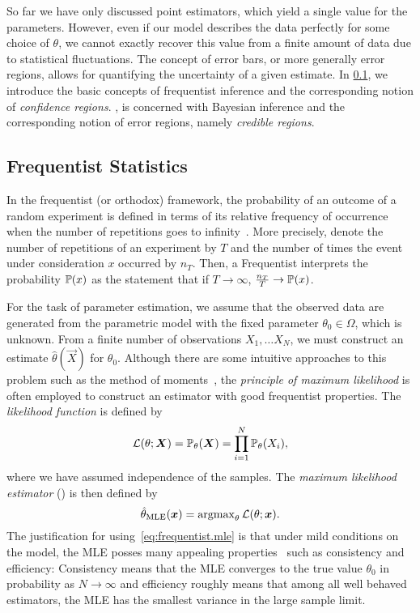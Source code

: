 So far we have only discussed point estimators, which yield a single value for the parameters.
However, even if our model describes the data perfectly for some choice of $\theta$, we cannot exactly recover this value from a finite amount of data due to statistical fluctuations.
The concept of error bars, or more generally error regions, allows for quantifying the uncertainty of a given estimate.
In \cref{sub:intro.frequentist}, we introduce the basic concepts of frequentist inference and the corresponding notion of \emph{confidence regions}.
, is concerned with Bayesian inference and the corresponding notion of error regions, namely \emph{credible regions}.



\subsection{Frequentist Statistics}
\label{sub:intro.frequentist}

In the frequentist (or orthodox) framework, the probability of an outcome of a random experiment is defined in terms of its relative frequency of occurrence when the number of repetitions goes to infinity~\cite{Keynes_2007_Treatise,Kiefer_2012_Introduction}.
More precisely, denote the number of repetitions of an experiment by $T$ and the number of times the event under consideration $x$ occurred by $n_T$.
Then, a Frequentist interprets the probability $\mathbb{P}(x)$ as the statement that if $T \to \infty$, $\frac{n_T}{T} \to \mathbb{P}(x)$.

For the task of parameter estimation, we assume that the observed data are generated from the parametric model with the fixed  parameter $\theta_0 \in \Omega$, which is unknown.
From a finite number of observations $X_1, \ldots X_N$, we must construct an estimate $\hat\theta(\vec X)$ for $\theta_0$.
Although there are some intuitive approaches to this problem such as the method of moments~\cite[Sec.\ 9.2]{Wasserman_2013_All}, the \emph{principle of maximum likelihood} is often employed to construct an estimator with good frequentist properties.
The \emph{likelihood function} is defined by
\[
  \mathcal{L}(\theta; \boldsymbol{X}) = \mathbb{P}_\theta(\boldsymbol{X}) = \prod_{i=1}^N \mathbb{P}_\theta(X_i),
  \label{eq:frequentist.likelihood_function}
\]
where we have assumed independence of the samples.
The \emph{maximum likelihood estimator} () is then defined by
\[
  \hat{\theta}_\mathrm{MLE}(\boldsymbol{x}) = \operatorname{argmax}_\theta \mathcal{L}(\theta; \boldsymbol{x}).
  \label{eq:frequentist.mle}
\]
The justification for using~\eqref{eq:frequentist.mle} is that under mild conditions on the model, the MLE posses many appealing properties~\cite[Sec.\ 9.4]{Wasserman_2013_All} such as consistency and efficiency:
Consistency means that the MLE converges to the true value $\theta_0$ in probability as $N \to \infty$ and efficiency roughly means that among all well behaved estimators, the MLE has the smallest variance in the large sample limit.\\


